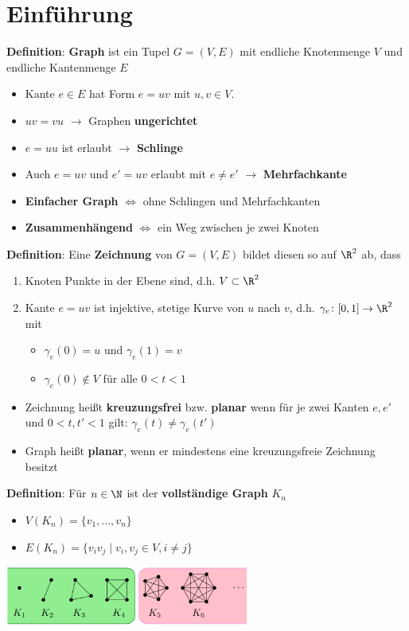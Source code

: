 \section{Einführung}

\textbf{Definition}: \textbf{Graph} ist ein Tupel $G=(V,E)$ mit endliche Knotenmenge $V$ und endliche Kantenmenge $E$
\begin{itemize}
	\item Kante $e \in E$ hat Form $e = uv$ mit $u,v \in V$.
	\item $uv = vu$ $\rightarrow$ Graphen \textbf{ungerichtet}
	\item $e = uu$ ist erlaubt $\rightarrow$ \textbf{Schlinge}
	\item Auch $e = uv$ und $e' = uv$ erlaubt mit $e \neq e'$ $\rightarrow$ \textbf{Mehrfachkante}
	\item \textbf{Einfacher Graph} $\iff$ ohne Schlingen und Mehrfachkanten
	\item \textbf{Zusammenhängend} $\iff$ ein Weg zwischen je zwei Knoten
\end{itemize}
\bigskip
\textbf{Definition}: Eine \textbf{Zeichnung} von $G = (V,E)$ bildet diesen so auf $\R^2$ ab, dass
\begin{enumerate}
	\item Knoten Punkte in der Ebene sind, d.h. $V \subset \R^2$
	\item Kante $e = uv$ ist injektive, stetige Kurve von $u$ nach $v$, d.h. $\gamma_e\colon [0,1] \rightarrow \R^2$ mit 
	\begin{itemize}
		\item $\gamma_e(0) = u$ und $\gamma_e(1) = v$
		\item $\gamma_e(0) \notin V$ für alle $0<t<1$
	\end{itemize}
\end{enumerate}
\medskip
\begin{itemize}
	\item Zeichnung heißt \textbf{kreuzungsfrei} bzw. \textbf{planar} wenn für je zwei Kanten $e, e'$ und $0 < t, t' < 1$ gilt: $\gamma_e(t)\neq\gamma_e(t')$
	\item Graph heißt \textbf{planar}, wenn er mindestens eine kreuzungsfreie Zeichnung besitzt
\end{itemize}
\bigskip
\textbf{Definition}: Für $n\in\N$ ist der \textbf{vollständige Graph} $K_n$
\begin{itemize}
	\item $V(K_n)=\{v_1,\ldots,v_n\}$
	\item $E(K_n)=\{v_iv_j\mid v_i,v_j\in V, i\neq j\}$
\end{itemize}
\begin{center}
	\includegraphics[width=0.6\textwidth]{images/k.png}
\end{center}

